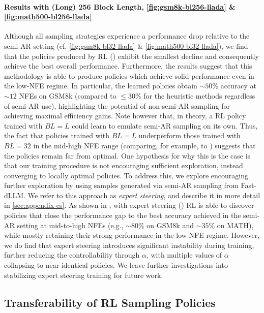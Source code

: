 \paragraph{Results with (Long) 256 Block Length, \autoref{fig:gsm8k-bl256-llada} \& \autoref{fig:math500-bl256-llada}}
Although all sampling strategies experience a performance drop relative to the semi-AR setting (cf. \autoref{fig:gsm8k-bl32-llada} \& \autoref{fig:math500-bl32-llada}), we find that the policies produced by RL (\greenline) exhibit the smallest decline and consequently achieve the best overall performance.
Furthermore, the results suggest that this methodology is able to produce policies which achieve solid performance even in the low-NFE regime.
In particular, the learned policies obtain $\sim 50\%$ accuracy at $\sim12$ NFEs on GSM8k (compared to $\leq30\%$ for the heuristic methods regardless of semi-AR use), highlighting the potential of non-semi-AR sampling for achieving maximal efficiency gains. Note however that, in theory, a RL policy trained with $BL=L$ could learn to emulate semi-AR sampling on its own. Thus, the fact that policies trained with $BL=L$ underperform those trained with $BL=32$ in the mid-high NFE range (comparing, for example,  to ) suggests that the policies remain far from optimal.
One hypothesis for why this is the case is that our training procedure is not encouraging sufficient exploration, instead converging to locally optimal policies.
To address this, we explore encouraging further exploration by using samples generated via semi-AR sampling from Fast-dLLM.
We refer to this approach as \emph{expert steering}, and describe it in more detail in \autoref{sec:appendix-es}.
As shown in , with expert steering (\purpleline) RL is able to discover policies that close the performance gap to the best accuracy achieved in the semi-AR setting at mid-to-high NFEs (e.g., $\sim 80\%$ on GSM8k and $\sim 35\%$ on MATH),
while mostly retaining their strong performance in the low-NFE regime.
However, we do find that expert steering introduces significant instability during training, further reducing the controllability through $\alpha$, with multiple values of $\alpha$ collapsing to near-identical policies.
We leave further investigations into stabilizing expert steering training for future work.





\subsection{Transferability of RL Sampling Policies}
\label{sec:exp-transfer}

